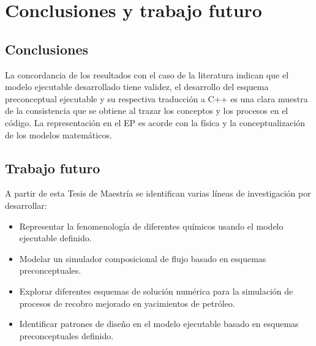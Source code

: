 \chapter{Conclusiones y trabajo futuro}\label{cap:Conclusiones}
\section{Conclusiones}
La concordancia de los resultados con el caso de la literatura indican que el modelo ejecutable desarrollado tiene validez, el desarrollo del esquema preconceptual ejecutable y su respectiva traducción a C++ es una clara muestra de la consistencia que se obtiene al trazar los conceptos y los procesos en el código. La representación en el EP es acorde con la física y la conceptualización de los modelos matemáticos.

\section{Trabajo futuro}

A partir de esta Tesis de Maestría se identifican varias líneas de investigación por desarrollar:

\begin{itemize}
	\item Representar la fenomenología de diferentes químicos usando el modelo ejecutable definido.
	\item Modelar un simulador composicional de flujo basado en esquemas preconceptuales.
	\item Explorar diferentes esquemas de solución numérica para la simulación de procesos de recobro mejorado en yacimientos de petróleo.
	\item Identificar patrones de diseño en el modelo ejecutable basado en esquemas preconceptuales definido.
\end{itemize}

